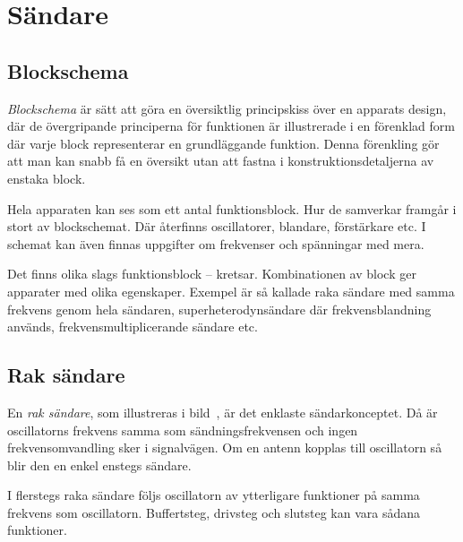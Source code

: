 \newpage
\section{Sändare}
\label{sändare}

\subsection{Blockschema}
\label{sändare_blockschema}

\emph{Blockschema} är sätt att göra en översiktlig principskiss över en
apparats design, där de övergripande principerna för funktionen är illustrerade
i en förenklad form där varje block representerar en grundläggande funktion.
Denna förenkling gör att man kan snabb få en översikt utan att fastna i
konstruktionsdetaljerna av enstaka block.

Hela apparaten kan ses som ett antal funktionsblock.
Hur de samverkar framgår i stort av blockschemat.
Där återfinns oscillatorer, blandare, förstärkare etc.
I schemat kan även finnas uppgifter om frekvenser och spänningar med mera.

Det finns olika slags funktionsblock -- kretsar.
Kombinationen av block ger apparater med olika egenskaper.
Exempel är så kallade raka sändare med samma frekvens genom hela sändaren,
superheterodynsändare där frekvensblandning används,
frekvensmultiplicerande sändare etc.



\subsection{Rak sändare}

En \emph{rak sändare}, som illustreras i bild~, är det
enklaste sändarkonceptet.
Då är oscillatorns frekvens samma som sändningsfrekvensen och ingen
frekvensomvandling sker i signalvägen.
Om en antenn kopplas till oscillatorn så blir den en enkel enstegs sändare.

I flerstegs raka sändare följs oscillatorn av ytterligare funktioner på samma
frekvens som oscillatorn.
Buffertsteg, drivsteg och slutsteg kan vara sådana funktioner.


